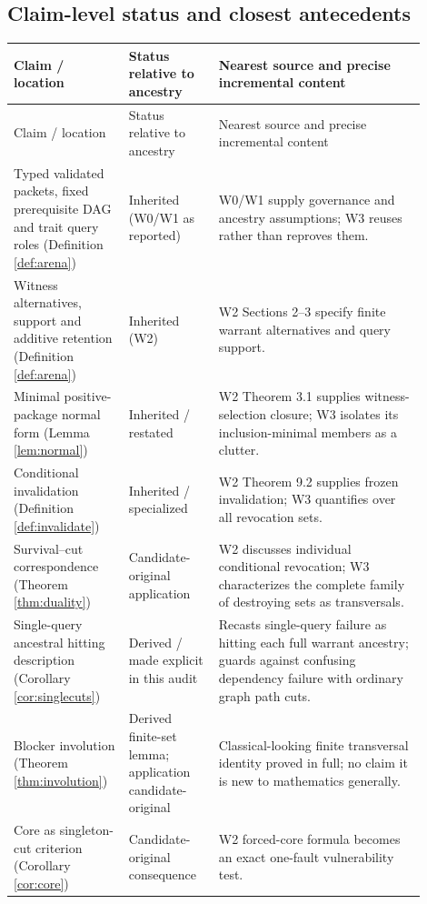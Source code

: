 \documentclass[11pt,letterpaper]{article}
\begin{document}
\subsection{Claim-level status and closest antecedents}
\small
\begin{longtable}{@{}>{\raggedright\arraybackslash}p{0.23\linewidth}>{\raggedright\arraybackslash}p{0.205\linewidth}>{\raggedright\arraybackslash}p{0.465\linewidth}@{}}
\toprule
Claim / location & Status relative to ancestry & Nearest source and precise incremental content\\\midrule
\endfirsthead
\toprule Claim / location & Status relative to ancestry & Nearest source and precise incremental content\\\midrule
\endhead
Typed validated packets, fixed prerequisite DAG and trait query roles (Definition \ref{def:arena}) & Inherited (W0/W1 as reported) & W0/W1 supply governance and ancestry assumptions; W3 reuses rather than reproves them.\\
Witness alternatives, support and additive retention (Definition \ref{def:arena}) & Inherited (W2) & W2 Sections 2--3 specify finite warrant alternatives and query support.\\
Minimal positive-package normal form (Lemma \ref{lem:normal}) & Inherited / restated & W2 Theorem 3.1 supplies witness-selection closure; W3 isolates its inclusion-minimal members as a clutter.\\
Conditional invalidation (Definition \ref{def:invalidate}) & Inherited / specialized & W2 Theorem 9.2 supplies frozen invalidation; W3 quantifies over all revocation sets.\\
Survival--cut correspondence (Theorem \ref{thm:duality}) & Candidate-original application & W2 discusses individual conditional revocation; W3 characterizes the complete family of destroying sets as transversals.\\
Single-query ancestral hitting description (Corollary \ref{cor:singlecuts}) & Derived / made explicit in this audit & Recasts single-query failure as hitting each full warrant ancestry; guards against confusing dependency failure with ordinary graph path cuts.\\
Blocker involution (Theorem \ref{thm:involution}) & Derived finite-set lemma; application candidate-original & Classical-looking finite transversal identity proved in full; no claim it is new to mathematics generally.\\
Core as singleton-cut criterion (Corollary \ref{cor:core}) & Candidate-original consequence & W2 forced-core formula becomes an exact one-fault vulnerability test.\\

\end{longtable}
\end{document}
